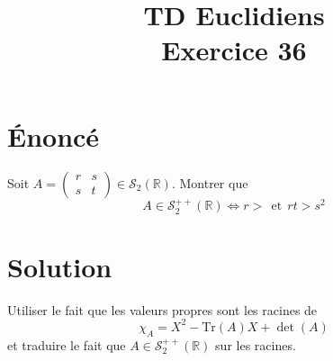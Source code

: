 \documentclass[french]{article}
\title{TD Euclidiens\\ Exercice 36}
\date{}
\newcommand{\R}{\mathbb{R}}
\newcommand{\Tr}{\text{Tr}}
\begin{document}
\maketitle

\section{Énoncé}
Soit $A=\displaystyle\begin{pmatrix}
	r&s\\
	s&t
\end{pmatrix}\in\mathcal{S}_2(\R)$. Montrer que $$A\in\mathcal{S}_{2}^{++}(\R)\iff r>\ \ \text{et} \ \ rt>s^2$$
\section{Solution}
Utiliser le fait que les valeurs propres sont les racines de $$\chi_A=X^2-\Tr(A)X+\det(A)$$ et traduire le fait que $A\in\mathcal{S}_2^{++}(\R)$ sur les racines.
\end{document}
